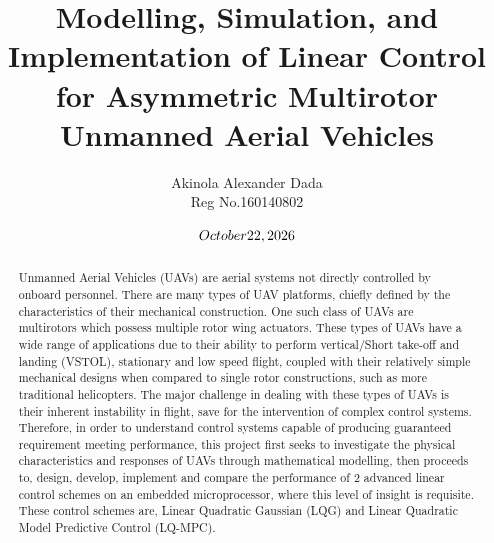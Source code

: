 \documentclass[12pt,a4paper,twoside]{report}
\title{ Modelling, Simulation, and Implementation of Linear Control for Asymmetric Multirotor Unmanned Aerial Vehicles}
\author{Akinola Alexander Dada \\ Reg No.160140802}
\date{$\today$}
\begin{document}
		
	\maketitle
	
	\newpage
	
	\tableofcontents
	
	\newpage
	
	\listoffigures
	
	\newpage
	
	\listoftables
	
	\newpage
	
	\begin{abstract}
		Unmanned Aerial Vehicles (UAVs) are aerial systems not directly controlled by onboard personnel. There are many types of UAV platforms, chiefly defined by the characteristics of their mechanical construction. One such class of UAVs are multirotors which possess multiple rotor wing actuators. These types of UAVs have a wide range of applications due to their ability to perform vertical/Short take-off and landing (VSTOL), stationary and low speed flight, coupled with their relatively simple mechanical designs when compared to single rotor constructions, such as more traditional helicopters. The major challenge in dealing with these types of UAVs is their inherent instability in flight, save for the intervention of complex control systems. Therefore, in order to understand control systems capable of producing guaranteed requirement meeting performance, this project first seeks to investigate the physical characteristics and responses of UAVs through mathematical modelling, then proceeds to, design, develop, implement and compare the performance of 2 advanced linear control schemes on an embedded microprocessor, where this level of insight is requisite. These control schemes are, Linear Quadratic Gaussian (LQG) and Linear Quadratic Model Predictive Control (LQ-MPC). 
	\end{abstract}
	\newpage
	
\end{document}
